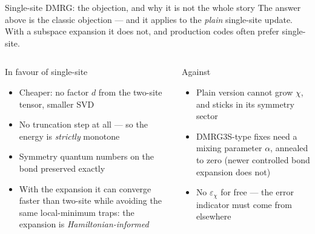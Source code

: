 \documentclass[aspectratio=169,10pt]{beamer}
\begin{document}
\begin{frame}{Single-site DMRG: the objection, and why it is not the whole story}
  The answer above is the classic objection --- and it applies to the \emph{plain} single-site update.
  With a \alert{subspace expansion} it does not, and production codes often prefer single-site.
  \small
  \begin{columns}[T]
    \begin{block}{In favour of single-site}
      \begin{itemize}
        \item Cheaper: no factor $d$ from the two-site tensor, smaller SVD
        \item \alert{No truncation step at all} --- so the energy is \emph{strictly} monotone
        \item Symmetry quantum numbers on the bond preserved exactly
        \item \alert{With the expansion it can converge faster than two-site} while avoiding the same
              local-minimum traps: the expansion is \emph{Hamiltonian-informed}
      \end{itemize}
    \end{block}
    \begin{block}{Against}
      \begin{itemize}
        \item Plain version cannot grow $\chi$, and sticks in its symmetry sector
        \item DMRG3S-type fixes need a mixing parameter $\alpha$, annealed to zero (newer controlled bond
              expansion does not)
        \item No $\varepsilon_\chi$ for free --- the error indicator must come from elsewhere
      \end{itemize}
    \end{block}
  \end{columns}
\end{frame}
\end{document}
